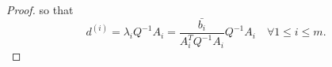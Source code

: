 \begin{proof}

so that 
\[
d^{(i)} = \lambda_i Q^{-1}A_i = \frac {\bar{b_i}}{A_i^T  Q^{-1}A_i}  Q^{-1}A_i \quad \forall 1\le i\le m.
\]


\end{proof}
